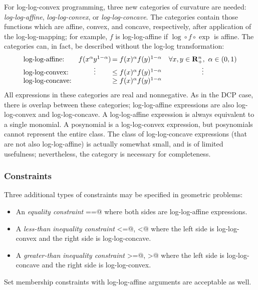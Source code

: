 \documentclass[12pt]{article}
\begin{document}
For log-log-convex programming, three new categories of curvature are needed:
\emph{log-log-affine}, \emph{log-log-convex}, or \emph{log-log-concave}.
The categories contain those functions which are affine, convex,
and concave, respectively, after application of the log-log-mapping;
for example, $f$ is log-log-affine if $\log\circ f\circ\exp$ is affine.
The categories can, in fact, be described without the log-log transformation:
\begin{equation*}
\begin{array}{lc@{\,}lc}
\text{log-log-affine:}  & f(x^\alpha y^{1-\alpha}) & = f(x)^\alpha f(y)^{1-\alpha}& \forall x,y\in\Rn_+,~\alpha\in(0,1) \\
\text{log-log-convex:}  & \vdots & \leq        f(x)^\alpha f(y)^{1-\alpha} & \vdots \\
\text{log-log-concave:} &        & \geq        f(x)^\alpha f(y)^{1-\alpha} &
\end{array}
\end{equation*}
All expressions in these categories are real and nonnegative. As in the DCP case,
there is overlap between these categories; log-log-affine expressions are also
log-log-convex and log-log-concave. A log-log-affine
expression is always equivalent to a single monomial.
A posynomial is a log-log-convex expression, but posynomials cannot
represent the entire class. The class of log-log-concave expressions
(that are not also log-log-affine) is actually somewhat small, and is of limited usefulness;
nevertheless, the category is necessary for completeness.

\subsubsection{Constraints}
\label{sec:gp-constraints}

Three additional types of constraints may be specified in geometric problems:
\begin{itemize}
\item An \emph{equality constraint} \verb@==@ where both sides are log-log-affine expressions.
\item A \emph{less-than inequality constraint} \verb@<=@, \verb@<@ 
where the left side is log-log-convex and the right side is log-log-concave.
\item A \emph{greater-than inequality constraint} \verb@>=@, \verb@>@ 
where the left side is log-log-concave and the right side is log-log-convex.
\end{itemize}
Set membership constraints with log-log-affine arguments are acceptable as well.
\end{document}
